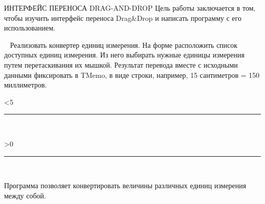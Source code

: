 

 {ИНТЕРФЕЙС ПЕРЕНОСА DRAG-AND-DROP}
\setcounter{page}{2}
\normalfont
{}
Цель работы заключается в том, чтобы изучить интерфейс переноса Drag\&Drop и написать программу с его использованием.  

\ 
Реализовать конвертер единиц измерения. На форме расположить список доступных единиц измерения. Из него выбирать нужные единицы измерения путем перетаскивания их мышкой. Результат перевода вместе с исходными данными фиксировать в TMemo, в виде строки, например, 15 сантиметров = 150 миллиметров. 

\clearpage
{}
{
\loop{}\ifnum\thepage<5{\hrule\hfill\\}\repeat
{}\setcounter{lc}{29}
\loop{}\ifnum\value{lc}>0{\addtocounter{lc}{-1}\hrule\hfill\\}\repeat
}
{}
 Программа позволяет конвертировать величины различных единиц измерения между собой.

